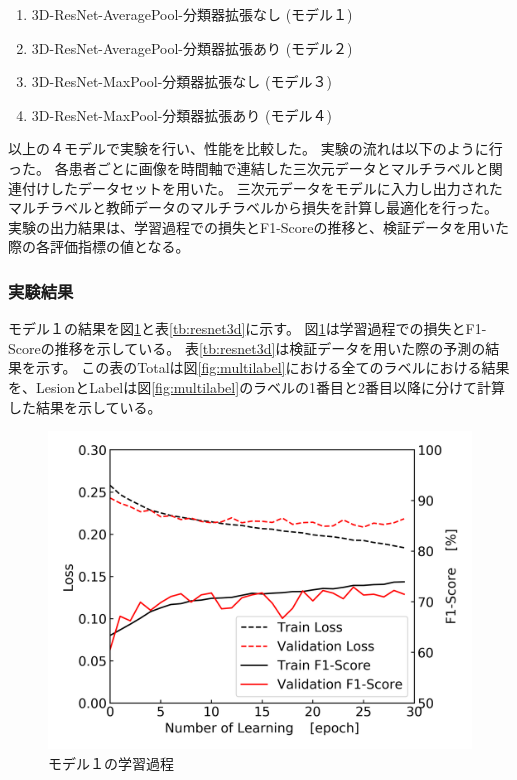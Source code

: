 \begin{enumerate}
    \item 3D-ResNet-AveragePool-分類器拡張なし (モデル１)
    \item 3D-ResNet-AveragePool-分類器拡張あり (モデル２)
    \item 3D-ResNet-MaxPool-分類器拡張なし (モデル３)
    \item 3D-ResNet-MaxPool-分類器拡張あり (モデル４)
\end{enumerate}
以上の４モデルで実験を行い、性能を比較した。
実験の流れは以下のように行った。
各患者ごとに画像を時間軸で連結した三次元データとマルチラベルと関連付けしたデータセットを用いた。
三次元データをモデルに入力し出力されたマルチラベルと教師データのマルチラベルから損失を計算し最適化を行った。
実験の出力結果は、学習過程での損失とF1-Scoreの推移と、検証データを用いた際の各評価指標の値となる。

\subsubsection{実験結果}
モデル１の結果を図\ref{fig:resnet3d_result_process}と表\ref{tb:resnet3d}に示す。
図\ref{fig:resnet3d_result_process}は学習過程での損失とF1-Scoreの推移を示している。
表\ref{tb:resnet3d}は検証データを用いた際の予測の結果を示す。
この表のTotalは図\ref{fig:multilabel}における全てのラベルにおける結果を、LesionとLabelは図\ref{fig:multilabel}のラベルの1番目と2番目以降に分けて計算した結果を示している。

\begin{figure}[htbp]
    \begin{center}
        \includegraphics[width=150mm]{./fig/resnet3dprocess.png}
        \caption{モデル１の学習過程}
        \label{fig:resnet3d_result_process}
    \end{center}
\end{figure}


